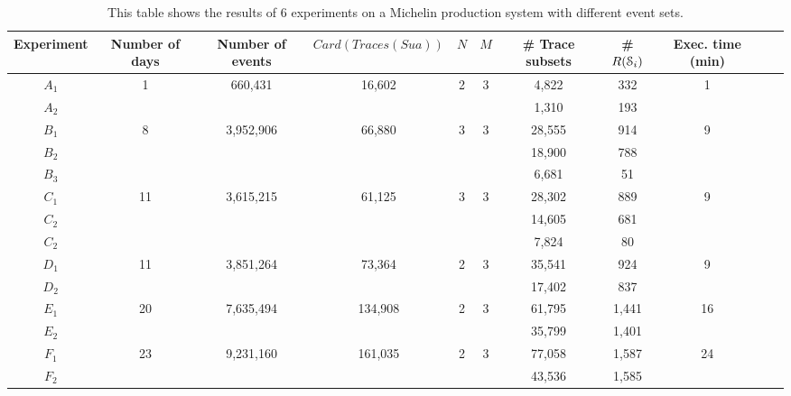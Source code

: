 \begin{table}
\begin{center}
\begin{tabular}{| c | c | c | c | c | c | c | c | c | c | c |}
\hline
Experiment & Number of days & Number of events &
$Card(Traces(Sua))$ & $N$ & $M$ & \# Trace subsets & \#
$R(\EuScript{S}_i)$ & Exec. time (min)\\
\hline
\hline
$A_1$ & 1     & 660,431   & 16,602  & 2 & 3 & 4,822  & 332   & 1 \\
$A_2$ &       &           &         &   &   & 1,310  & 193   &   \\
\hline
$B_1$ & 8     & 3,952,906 & 66,880  & 3 & 3 & 28,555 & 914   & 9 \\
$B_2$ &       &           &         &   &   & 18,900 & 788   &   \\
$B_3$ &       &           &         &   &   &  6,681 &  51   &   \\
\hline
$C_1$ & 11    & 3,615,215 & 61,125  & 3 & 3 & 28,302 & 889   & 9 \\
$C_2$ &       &           &         &   &   & 14,605 & 681   &   \\
$C_2$ &       &           &         &   &   &  7,824 &  80   &   \\
\hline
$D_1$ & 11    & 3,851,264 & 73,364  & 2 & 3 & 35,541 & 924   & 9 \\
$D_2$ &       &           &         &   &   & 17,402 & 837   &   \\
\hline
$E_1$ & 20    & 7,635,494 & 134,908 & 2 & 3 & 61,795 & 1,441 & 16 \\
$E_2$ &       &           &         &   &   & 35,799 & 1,401 &    \\
\hline
$F_1$ & 23    & 9,231,160 & 161,035 & 2 & 3 & 77,058 & 1,587 & 24 \\
$F_2$ &       &           &         &   &   & 43,536 & 1,585 &    \\
\hline
\end{tabular}
\end{center}

\caption{This table shows the results of 6 experiments on a
Michelin production system with different event sets.}
\label{fig:results}
\end{table}

